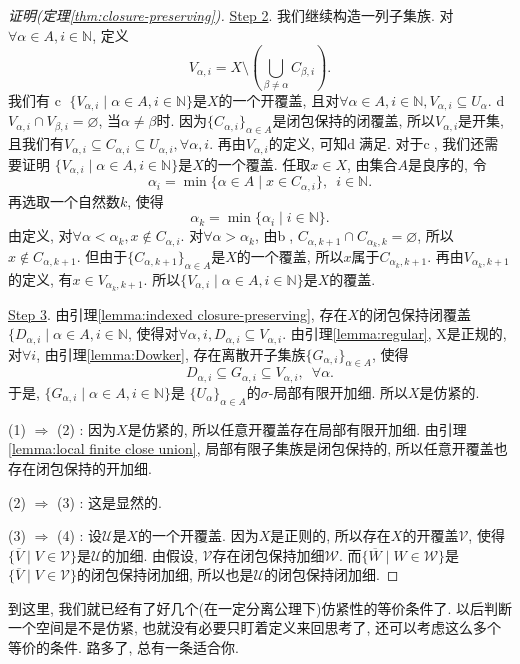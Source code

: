 \begin{proof}[证明(定理\ref{thm:closure-preserving})]
  \underline{Step 2}.
  我们继续构造一列子集族. 对$\forall \alpha \in A, i \in \mathbb{N}$, 定义
  \[
    V_{\alpha, i} = X \setminus (\bigcup_{\beta \neq \alpha} C_{\beta, i}).
  \]
  我们有\newline
  \textcircled{c}
    $\{ V_{\alpha, i} \mid \alpha \in A, i \in \mathbb{N} \}$是$X$的一个开覆盖,
    且对$\forall \alpha \in A, i \in \mathbb{N}, V_{\alpha, i} \subseteq U_\alpha$. \newline
  \textcircled{d}
    $V_{\alpha, i} \cap V_{\beta, i} = \varnothing$, 当$\alpha \neq \beta$时. \newline
  因为$\{ C_{\alpha, i} \}_{\alpha \in A}$是闭包保持的闭覆盖, 所以$V_{\alpha, i}$是开集,
  且我们有$V_{\alpha, i} \subseteq C_{\alpha, i} \subseteq U_{\alpha, i}, \forall \alpha, i$.
  再由$V_{\alpha, i}$的定义, 可知\textcircled{d}满足.
  对于\textcircled{c}, 我们还需要证明
  $\{ V_{\alpha, i} \mid \alpha \in A, i \in \mathbb{N} \}$是$X$的一个覆盖.
  任取$x \in X$, 由集合$A$是良序的, 令
  \[
    \alpha_i = \min \{ \alpha \in A \mid x \in C_{\alpha, i} \}, \,\,\, i \in \mathbb{N}.
  \]
  再选取一个自然数$k$, 使得
  \[
    \alpha_k = \min \{ \alpha_i \mid i \in \mathbb{N} \}.
  \]
  由定义, 对$\forall \alpha < \alpha_k, x \notin C_{\alpha, i}$.
  对$\forall \alpha > \alpha_k$, 由\textcircled{b},
  $C_{\alpha, k+1} \cap C_{\alpha_k, k} = \varnothing$,
  所以$x \notin C_{\alpha, k+1}$. 但由于$\{ C_{\alpha, k+1} \}_{\alpha \in A}$是$X$的一个覆盖,
  所以$x$属于$C_{\alpha_k, k+1}$. 再由$V_{\alpha_k, k+1}$的定义,
  有$x \in V_{\alpha_k, k+1}$.
  所以$\{ V_{\alpha, i} \mid \alpha \in A, i \in \mathbb{N} \}$是$X$的覆盖.

  \underline{Step 3}.
  由引理\ref{lemma:indexed closure-preserving},
  存在$X$的闭包保持闭覆盖$\{ D_{\alpha, i} \mid \alpha \in A, i \in \mathbb{N}$,
  使得对$\forall \alpha, i, D_{\alpha, i} \subseteq V_{\alpha, i}$.
  由引理\ref{lemma:regular}, X是正规的, 对$\forall i$, 由引理\ref{lemma:Dowker},
  存在离散开子集族$\{ G_{\alpha, i} \}_{\alpha \in A}$, 使得
  \[
    D_{\alpha, i} \subseteq G_{\alpha, i} \subseteq V_{\alpha, i}, \,\,\, \forall \alpha.
  \]
  于是, $\{ G_{\alpha, i} \mid \alpha \in A, i \in \mathbb{N} \}$是
  $\{ U_\alpha \}_{\alpha \in A}$的$\sigma$-局部有限开加细. 所以$X$是仿紧的.

  (1) $\Rightarrow$ (2) :
  因为$X$是仿紧的, 所以任意开覆盖存在局部有限开加细.
  由引理\ref{lemma:local finite close union}, 局部有限子集族是闭包保持的,
  所以任意开覆盖也存在闭包保持的开加细.

  (2) $\Rightarrow$ (3) :
  这是显然的.

  (3) $\Rightarrow$ (4) :
  设$\mathscr{U}$是$X$的一个开覆盖.
  因为$X$是正则的, 所以存在$X$的开覆盖$\mathscr{V}$, 使得
  $\{ \overline{V} \mid V \in \mathscr{V} \}$是$\mathscr{U}$的加细.
  由假设, $\mathscr{V}$存在闭包保持加细$\mathscr{W}$.
  而$\{ \overline{W} \mid W \in \mathscr{W} \}$是
  $\{ \overline{V} \mid V \in \mathscr{V} \}$的闭包保持闭加细,
  所以也是$\mathscr{U}$的闭包保持闭加细.
\end{proof}

到这里, 我们就已经有了好几个(在一定分离公理下)仿紧性的等价条件了.
以后判断一个空间是不是仿紧, 也就没有必要只盯着定义来回思考了,
还可以考虑这么多个等价的条件. 路多了, 总有一条适合你.

